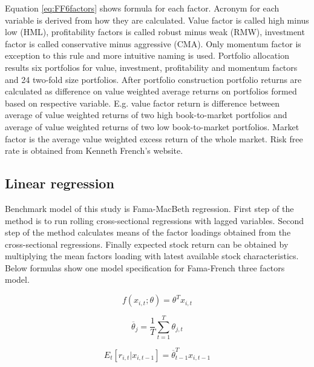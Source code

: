 \documentclass{article}
\begin{document}
Equation \ref{eq:FF6factors} shows formula for each factor. Acronym for each variable is derived from how they are calculated. Value factor is called high minus low (HML), profitability factors is called robust minus weak (RMW), investment factor is called conservative minus aggressive (CMA). Only momentum factor is exception to this rule and more intuitive naming is used. Portfolio allocation results six portfolios for value, investment, profitability and momentum factors and 24 two-fold size portfolios. After portfolio construction portfolio returns are calculated as difference on value weighted average returns on portfolios formed based on respective variable. E.g. value factor return is difference between average of value weighted returns of two high book-to-market portfolios and average of value weighted returns of two low book-to-market portfolios. Market factor is the average value weighted excess return of the whole market. Risk free rate is obtained from Kenneth French's website. \par

\subsection{Linear regression}\label{LinearRegression}
Benchmark model of this study is Fama-MacBeth \citeyear{FamaMacBeth1973} regression. First step of the method is to run rolling cross-sectional regressions with lagged variables. Second step of the method calculates means of the factor loadings obtained from the cross-sectional regressions. Finally expected stock return can be obtained by multiplying the mean factors loading with latest available stock characteristics. Below formulas show one model specification for Fama-French \citeyear{FAMA19933} three factors model. \par

\begin{equation}
f(x_{i, t}; \theta) = \theta^T x_{i, t}
\end{equation}

\begin{equation}
\overline \theta_j = \frac{1}{T} \sum^{T}_{t=1}\theta_{j, t}
\end{equation}

\begin{equation}
E_t \left[ r_{i, t} | x_{i, t-1} \right] = \overline \theta_{t-1}^T x_{i, t-1}
\end{equation}
\end{document}
